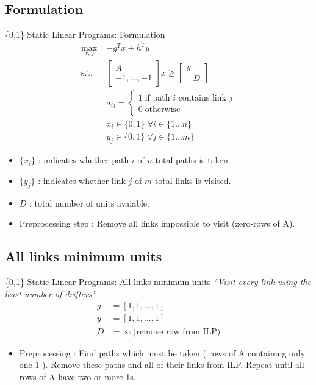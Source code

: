 \documentclass[xcolor=pdflatex,dvipsnames,table]{beamer}
\begin{document}
\subsection{Formulation}
\begin{frame}{\{0,1\} Static Linear Programs: Formulation}
\begin{align*}
\max_{x,y}\;& -g^Tx + h^Ty \\
\mbox{s.t.}\;& \left[ \begin{array}{c}
                       A\\
                       -1, \dots, -1
                      \end{array}\right] x \geq \left[ \begin{array}{c} y\\-D \end{array}\right] \\
&a_{ij} = \begin{cases}
           1\;\mbox{if path $i$ contains link $j$}\\
           0\;\mbox{otherwise}
          \end{cases}\\
&x_i \in \{0,1\}\;\forall i\in\{1\dots n\}\\
&y_j \in \{0,1\}\;\forall j\in\{1\dots m\}
\end{align*}

\begin{itemize}
\item $\{x_i\}$ : indicates whether path $i$ of $n$ total paths is taken.
\item $\{y_j\}$ : indicates whether link $j$ of $m$ total links is visited.
\item $D$ : total number of units avaiable.
\item Preprocessing step : Remove all links impossible to visit (zero-rows of A).
\end{itemize}

\end{frame}


\subsection{All links minimum units}
\begin{frame}{\{0,1\} Static Linear Programs: All links minimum units}
\emph{``Visit every link using the least number of drifters''}
\begin{align*}
g &= \left[ 1,1, \dots ,1\right]\\
y &= \left[ 1,1, \dots ,1\right]\\
D &= \infty \;\mbox{(remove row from ILP)}
\end{align*}

\begin{itemize}
 \item Preprocessing : Find paths which must be taken ( rows of A containing only one 1 ). Remove these paths and all of their links from ILP. Repeat until all rows of A have two or more 1s.
\end{itemize}
\end{frame}
\end{document}
